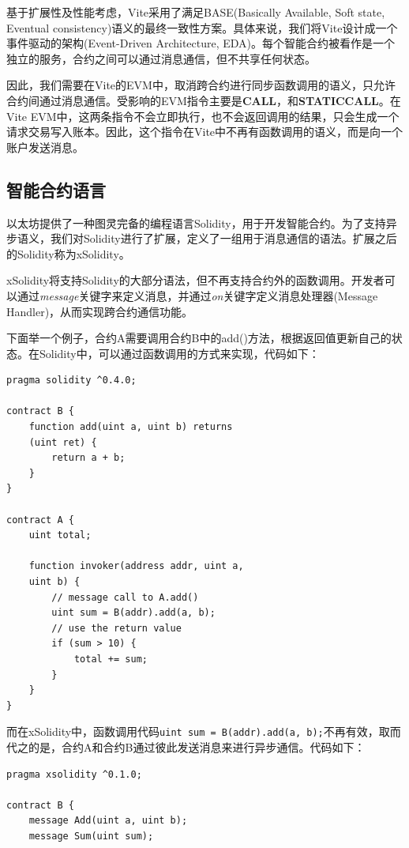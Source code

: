 \documentclass[UTF8,nofonts]{ctexart}
\begin{document}
\begin{multicols}{2}
基于扩展性及性能考虑，Vite采用了满足BASE(Basically Available, Soft state, Eventual consistency)\cite{Pritchett:2008:BAA:1394127.1394128}语义的最终一致性方案。具体来说，我们将Vite设计成一个事件驱动的架构(Event-Driven Architecture, EDA)\cite{eda}。每个智能合约被看作是一个独立的服务，合约之间可以通过消息通信，但不共享任何状态。

因此，我们需要在Vite的EVM中，取消跨合约进行同步函数调用的语义，只允许合约间通过消息通信。受影响的EVM指令主要是\textbf{CALL}，和\textbf{STATICCALL}。在Vite EVM中，这两条指令不会立即执行，也不会返回调用的结果，只会生成一个请求交易写入账本。因此，这个指令在Vite中不再有函数调用的语义，而是向一个账户发送消息。

\subsection{智能合约语言}
以太坊提供了一种图灵完备的编程语言Solidity，用于开发智能合约。为了支持异步语义，我们对Solidity进行了扩展，定义了一组用于消息通信的语法。扩展之后的Solidity称为xSolidity。

xSolidity将支持Solidity的大部分语法，但不再支持合约外的函数调用。开发者可以通过\emph{message}关键字来定义消息，并通过\emph{on}关键字定义消息处理器(Message Handler)，从而实现跨合约通信功能。

下面举一个例子，合约A需要调用合约B中的add()方法，根据返回值更新自己的状态。在Solidity中，可以通过函数调用的方式来实现，代码如下：

\begin{verbatim}
pragma solidity ^0.4.0;

contract B {
    function add(uint a, uint b) returns
    (uint ret) { 
        return a + b;
    }
}

contract A {
    uint total;    
   
    function invoker(address addr, uint a,
    uint b) {
        // message call to A.add()
        uint sum = B(addr).add(a, b);
        // use the return value
        if (sum > 10) {
            total += sum;
        }
    }
}
\end{verbatim}

而在xSolidity中，函数调用代码\texttt{uint sum = B(addr).add(a, b);}不再有效，取而代之的是，合约A和合约B通过彼此发送消息来进行异步通信。代码如下：

\begin{verbatim}
pragma xsolidity ^0.1.0;

contract B {
    message Add(uint a, uint b);
    message Sum(uint sum);
    

\end{verbatim}
\end{multicols}
\end{document}

